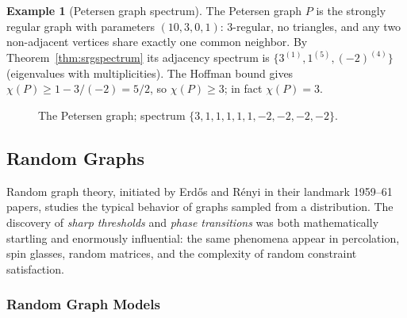 \documentclass{article}
\theoremstyle{definition}
\newtheorem{example}{Example}
\begin{document}
\begin{example}[Petersen graph spectrum]
The Petersen graph $P$ is the strongly regular graph with parameters
$(10, 3, 0, 1)$: $3$-regular, no triangles, and any two non-adjacent
vertices share exactly one common neighbor. By
Theorem~\ref{thm:srgspectrum} its adjacency spectrum is
$\{3^{(1)}, 1^{(5)}, (-2)^{(4)}\}$ (eigenvalues with multiplicities).
The Hoffman bound gives $\chi(P) \ge 1 - 3/(-2) = 5/2$, so
$\chi(P) \ge 3$; in fact $\chi(P) = 3$.

\begin{figure}[ht]
\centering
{}
\caption{The Petersen graph; spectrum $\{3, 1, 1, 1, 1, 1, -2, -2, -2, -2\}$.}
\label{fig:petersen-spectrum}
\end{figure}
\end{example}

\subsection{Random Graphs}

Random graph theory, initiated by Erd\H{o}s and R\'enyi in their
landmark 1959--61 papers, studies the typical behavior of graphs
sampled from a distribution. The discovery of \emph{sharp thresholds}
and \emph{phase transitions} was both mathematically startling and
enormously influential: the same phenomena appear in percolation,
spin glasses, random matrices, and the complexity of random
constraint satisfaction.

\subsubsection{Random Graph Models}
\end{document}
